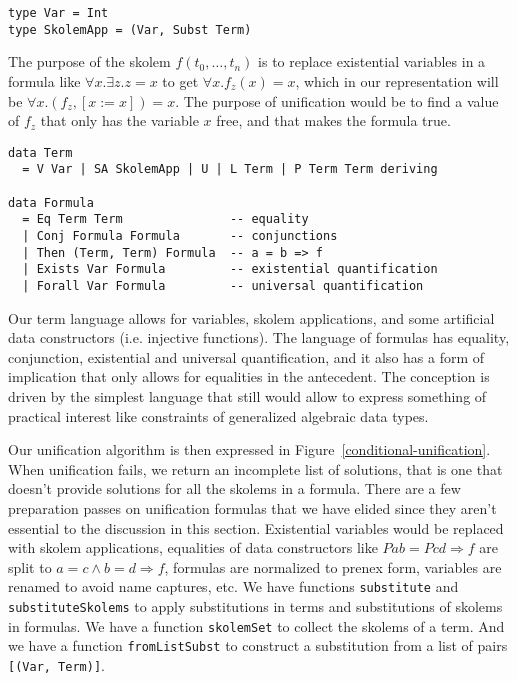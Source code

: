 \documentclass[acmtog, anonymous]{acmart}
\newcommand{\tc}[1]{{\small\texttt{#1}}}
\begin{document}
\begin{verbatim}
type Var = Int
type SkolemApp = (Var, Subst Term)
\end{verbatim}

The purpose of the skolem $f(t_0,\ldots,t_n)$ is to replace existential variables
in a formula like $\forall x. \exists z. z = x$ to get $\forall x. f_z(x) = x$, which
in our representation will be $\forall x. (f_z, [x:=x]) = x$.
The purpose of unification would be to find a value of $f_z$ that only has the variable
$x$ free, and that makes the formula true.

\begin{verbatim}
data Term
  = V Var | SA SkolemApp | U | L Term | P Term Term deriving

data Formula
  = Eq Term Term               -- equality
  | Conj Formula Formula       -- conjunctions
  | Then (Term, Term) Formula  -- a = b => f
  | Exists Var Formula         -- existential quantification
  | Forall Var Formula         -- universal quantification
\end{verbatim}

Our term language allows for variables, skolem applications, and some artificial
data constructors (i.e. injective functions). The language of formulas has
equality, conjunction, existential and universal quantification, and it also
has a form of implication that only allows for equalities in the antecedent.
The conception is driven by the simplest language that still would allow to
express something of practical interest like constraints of generalized
algebraic data types.

Our unification algorithm is then expressed in Figure~\ref{conditional-unification}.
When unification fails, we return an incomplete list of solutions, that is one that
doesn't provide solutions for all the skolems in a formula.
There are a few preparation passes on unification formulas that we have elided since
they aren't essential to the discussion in this section.
Existential variables would be replaced with skolem applications, equalities of
data constructors like $P a b = P c d \Rightarrow f$ are split to
$a = c \land b = d \Rightarrow f$, formulas are normalized to prenex form, variables
are renamed to avoid name captures, etc. We have functions \tc{substitute} and
\tc{substituteSkolems} to apply substitutions in terms and substitutions of skolems
in formulas. We have a function \tc{skolemSet} to collect the skolems of a
term. And we have a function \tc{fromListSubst} to construct a substitution from
a list of pairs \tc{[(Var, Term)]}.
\end{document}
